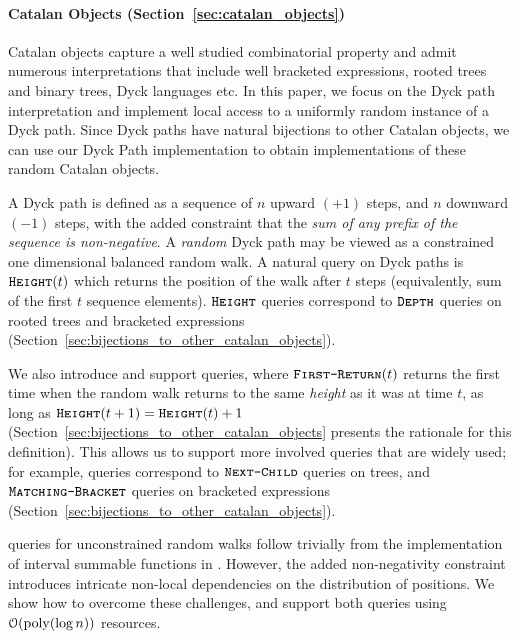 \paragraph*{Catalan Objects (Section~\ref{sec:catalan_objects})}%
\label{par:intro_catalan_objects}
Catalan objects capture a well studied combinatorial property and admit numerous interpretations that include
well bracketed expressions, rooted trees and binary trees, Dyck languages etc.
In this paper, we focus on the Dyck path interpretation and implement local access to a uniformly random instance of a Dyck path.
Since Dyck paths have natural bijections to other Catalan objects,
we can use our Dyck Path implementation to obtain implementations of these random Catalan objects.

A Dyck path is defined as a sequence of $n$ upward $(+1)$ steps, and $n$ downward $(-1)$ steps,
with the added constraint that the \emph{sum of any prefix of the sequence is non-negative}.
A \emph{random} Dyck path may be viewed as a constrained one dimensional balanced random walk.
A natural query on Dyck paths is $\texttt{\textsc{Height}}(t)$ which returns the position of the walk after $t$ steps
(equivalently, sum of the first $t$ sequence elements).
$\texttt{\textsc{Height}}$ queries correspond to $\texttt{\textsc{Depth}}$ queries on rooted trees and bracketed expressions
(Section~\ref{sec:bijections_to_other_catalan_objects}).

We also introduce and support  queries, where $\texttt{\textsc{First-Return}}(t)$ returns
the first time when the random walk returns to the same \emph{height} as it was at time $t$, as long as $\texttt{\textsc{Height}}(t+1)=\texttt{\textsc{Height}}(t)+1$
(Section~\ref{sec:bijections_to_other_catalan_objects} presents the rationale for this definition).
This allows us to support more involved queries that are widely used;
for example,  queries correspond to $\texttt{\textsc{Next-Child}}$ queries on trees,
and $\texttt{\textsc{Matching-Bracket}}$ queries on bracketed expressions (Section~\ref{sec:bijections_to_other_catalan_objects}).

 queries for unconstrained random walks follow trivially from the implementation of interval summable functions in \cite{huge}.
However, the added non-negativity constraint introduces intricate non-local dependencies on the distribution of positions.
We show how to overcome these challenges, and support both queries using $\mathcal O(\mathrm{poly}(\log n))$ resources.

